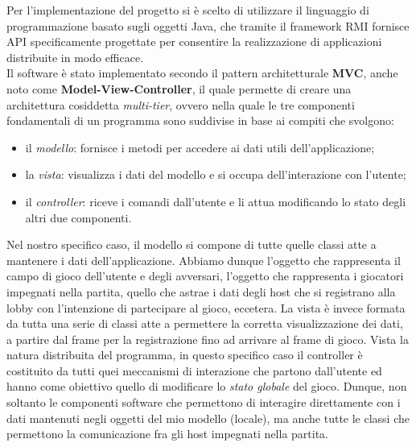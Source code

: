 Per l'implementazione del progetto si è scelto di utilizzare il linguaggio 
di programmazione basato sugli oggetti Java, che tramite il framework RMI 
fornisce API specificamente progettate per consentire la realizzazione di 
applicazioni distribuite in modo efficace.
\\
Il software è stato implementato secondo il pattern architetturale \textbf{MVC},
anche noto come \textbf{Model-View-Controller}, il quale permette di creare una
architettura cosiddetta \textit{multi-tier}, ovvero nella quale le tre
componenti fondamentali di un programma sono suddivise in base ai compiti che
svolgono:
\begin{itemize}
	\item il \textit{modello}: fornisce i metodi per accedere ai dati utili
	dell'applicazione;
	\item la \textit{vista}: visualizza i dati del modello e si 
occupa
	dell'interazione con l'utente;
	\item il \textit{controller}: riceve i comandi dall'utente e li attua
	modificando lo stato degli altri due componenti.
\end{itemize}
Nel nostro specifico caso, il modello si compone di tutte quelle classi atte a
mantenere i dati dell'applicazione. Abbiamo dunque l'oggetto che rappresenta il
campo di gioco dell'utente e degli avversari, l'oggetto che rappresenta i
giocatori impegnati nella partita, quello che astrae i dati degli host che si
registrano alla lobby con l'intenzione di partecipare al gioco,
eccetera.\newline
La vista è invece formata da tutta una serie di classi atte a permettere la
corretta visualizzazione dei dati, a partire dal frame per la registrazione fino
ad arrivare al frame di gioco.\newline
Vista la natura distribuita del programma, in questo specifico caso il
controller è costituito da tutti quei meccanismi di interazione che
partono dall'utente ed hanno come obiettivo quello di modificare lo
\textit{stato globale} del gioco. Dunque, non soltanto le componenti software
che permettono di interagire direttamente con i dati mantenuti negli oggetti
del mio modello (locale), ma anche tutte le classi che permettono la
comunicazione fra gli host impegnati nella partita.\newline